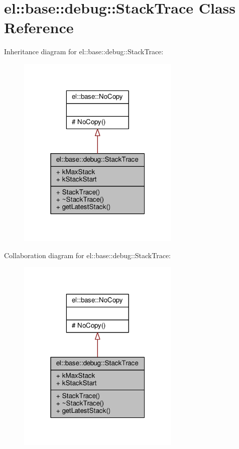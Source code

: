 \hypertarget{classel_1_1base_1_1debug_1_1StackTrace}{}\section{el\+:\+:base\+:\+:debug\+:\+:Stack\+Trace Class Reference}
\label{classel_1_1base_1_1debug_1_1StackTrace}


Inheritance diagram for el\+:\+:base\+:\+:debug\+:\+:Stack\+Trace\+:
\nopagebreak
\begin{figure}[H]
\begin{center}
\leavevmode
\includegraphics[width=220pt]{d8/d6c/classel_1_1base_1_1debug_1_1StackTrace__inherit__graph}
\end{center}
\end{figure}


Collaboration diagram for el\+:\+:base\+:\+:debug\+:\+:Stack\+Trace\+:
\nopagebreak
\begin{figure}[H]
\begin{center}
\leavevmode
\includegraphics[width=220pt]{d4/d8e/classel_1_1base_1_1debug_1_1StackTrace__coll__graph}
\end{center}
\end{figure}
